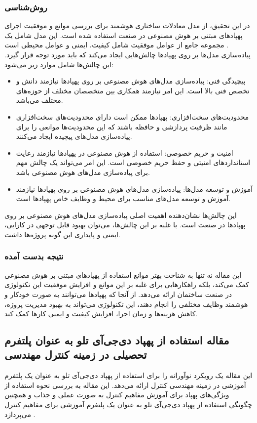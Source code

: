 \subsubsection{روش‌شناسی}
در این تحقیق، از مدل معادلات ساختاری هوشمند برای بررسی موانع و موفقیت اجرای پهپادهای مبتنی بر هوش مصنوعی در صنعت استفاده شده است.
این مدل شامل یک مجموعه جامع از عوامل موفقیت شامل کیفیت، ایمنی و عوامل محیطی است .
\\
پیاده‌سازی مدل‌ها بر روی پهپادها چالش‌هایی ایجاد می‌کند که باید مورد توجه قرار گیرد. این چالش‌ها شامل موارد زیر می‌شود:
\begin{itemize}
    \item پیچیدگی فنی: پیاده‌سازی مدل‌های هوش مصنوعی بر روی پهپادها نیازمند دانش و تخصص فنی بالا است. این امر نیازمند همکاری بین متخصصان مختلف از حوزه‌های مختلف می‌باشد.
    \item محدودیت‌های سخت‌افزاری: پهپادها ممکن است دارای محدودیت‌های سخت‌افزاری مانند ظرفیت پردازشی و حافظه باشند که این محدودیت‌ها موانعی را برای پیاده‌سازی مدل‌های پیچیده ایجاد می‌کنند.
    \item امنیت و حریم خصوصی: استفاده از هوش مصنوعی در پهپادها نیازمند رعایت استانداردهای امنیتی و حفظ حریم خصوصی است. این امر می‌تواند یک چالش مهم برای پیاده‌سازی مدل‌های هوش مصنوعی باشد.
    \item آموزش و توسعه مدل‌ها: پیاده‌سازی مدل‌های هوش مصنوعی بر روی پهپادها نیازمند آموزش و توسعه مدل‌های مناسب برای محیط و وظایف خاص پهپادها است.
\end{itemize}
این چالش‌ها نشان‌دهنده اهمیت اصلی پیاده‌سازی مدل‌های هوش مصنوعی بر روی پهپادها در صنعت است. با غلبه بر این چالش‌ها، می‌توان بهبود 
قابل توجهی در کارایی، ایمنی و پایداری این گونه پروژه‌‌ها داشت.

\subsubsection{نتیجه بدست آمده}
این مقاله نه تنها به شناخت بهتر موانع استفاده از پهپادهای مبتنی بر هوش مصنوعی کمک می‌کند، بلکه راهکارهایی برای غلبه بر این موانع و افزایش موفقیت این تکنولوژی در صنعت ساختمان ارائه می‌دهد. از آنجا که
پهپادها می‌توانند به صورت خودکار و هوشمند وظایف مختلفی را انجام دهند، این تکنولوژی می‌تواند به بهبود مدیریت پروژه، کاهش هزینه‌ها و زمان اجرا، افزایش کیفیت و ایمنی کارها کمک کند.


\subsection[مقاله استفاده از پهپاد دی‌جی‌آی تلو به عنوان پلتفرم تحصیلی در زمینه کنترل مهندسی]{مقاله استفاده از پهپاد دی‌جی‌آی تلو به عنوان پلتفرم تحصیلی در زمینه کنترل مهندسی \protect{}}
این مقاله یک رویکرد نوآورانه را برای استفاده از پهپاد دی‌جی‌آی تلو  به عنوان یک پلتفرم آموزشی در زمینه مهندسی کنترل ارائه می‌دهد. این مقاله به بررسی نحوه استفاده از ویژگی‌های پهپاد برای 
آموزش مفاهیم کنترل به صورت عملی و جذاب و همچنین چگونگی استفاده از پهپاد دی‌جی‌آی تلو به عنوان یک پلتفرم آموزشی برای مفاهیم کنترل می‌پردازد \cite{ghazi2023use}.

